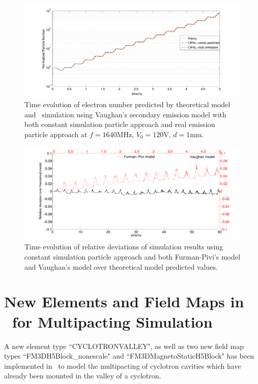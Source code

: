 \documentclass[a4paper,11pt]{article}
\begin{document}
\begin{appendices}
\begin{figure}[H]
\begin{center}
\includegraphics[width=1\textwidth]{const_particle_benchmark.pdf}
\end{center}
\caption{Time evolution of electron number predicted by theoretical model and \opal\ simulation using Vaughan's secondary emission model with both constant simulation particle approach and real emission particle approach at $f=1640$MHz, $V_0=120$V, $d=1$mm.\label{fig:constp}}
\end{figure}

\begin{figure}[H]
\begin{center}
\includegraphics[width=1\textwidth]{models_comp_const_part.pdf}
\end{center}
\caption{Time evolution of relative deviations of simulation results using constant simulation particle approach and both Furman-Pivi's model and Vaughan's model over theoretical model predicted values.\label{fig:de_const}}
\end{figure}
\section{New Elements and Field Maps in \opal\ for Multipacting Simulation}
A new element type ``CYCLOTRONVALLEY", as well as two new field map types ``FM3DH5Block\_nonescale" and ``FM3DMagnetoStaticH5Block" has been implemented in \opal\ to model the multipacting of cyclotron cavities which have already been mounted in the valley of a cyclotron. 


\end{appendices}
\end{document}
